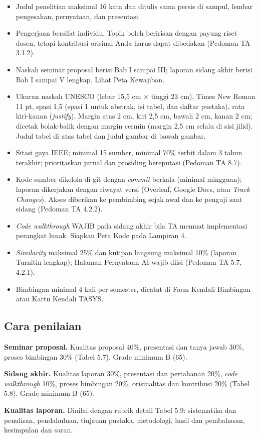 \begin{itemize}[label=\textbullet, leftmargin=1.2em, itemsep=2pt]
  \item Judul penelitian maksimal 16 kata dan ditulis sama persis di sampul,
        lembar pengesahan, pernyataan, dan presentasi.
  \item Pengerjaan bersifat individu. Topik boleh beririsan dengan payung riset
        dosen, tetapi kontribusi orisinal Anda harus dapat dibedakan (Pedoman
        TA 3.1.2).
  \item Naskah seminar proposal berisi Bab I sampai III; laporan sidang akhir
        berisi Bab I sampai V lengkap. Lihat Peta Kewajiban.
  \item Ukuran naskah UNESCO (lebar 15,5 cm $\times$ tinggi 23 cm), Times New
        Roman 11 pt, spasi 1,5 (spasi 1 untuk abstrak, isi tabel, dan daftar
        pustaka), rata kiri-kanan (\textit{justify}). Margin atas 2 cm, kiri
        2,5 cm, bawah 2 cm, kanan 2 cm; dicetak bolak-balik dengan margin
        cermin (margin 2,5 cm selalu di sisi jilid). Judul tabel di atas tabel
        dan judul gambar di bawah gambar.
  \item Sitasi gaya IEEE; minimal 15 sumber, minimal 70\% terbit dalam 3 tahun
        terakhir; prioritaskan jurnal dan prosiding bereputasi (Pedoman TA 8.7).
  \item Kode sumber dikelola di git dengan \textit{commit} berkala (minimal
        mingguan); laporan dikerjakan dengan riwayat versi (Overleaf, Google
        Docs, atau \textit{Track Changes}). Akses diberikan ke pembimbing sejak
        awal dan ke penguji saat sidang (Pedoman TA 4.2.2).
  \item \textit{Code walkthrough} WAJIB pada sidang akhir bila TA memuat
        implementasi perangkat lunak. Siapkan Peta Kode pada Lampiran 4.
  \item \textit{Similarity} maksimal 25\% dan kutipan langsung maksimal 10\%
        (laporan Turnitin lengkap); Halaman Pernyataan AI wajib diisi (Pedoman
        TA 5.7, 4.2.1).
  \item Bimbingan minimal 4 kali per semester, dicatat di Form Kendali
        Bimbingan atau Kartu Kendali TASYS.
\end{itemize}

\subsection*{Cara penilaian}
\noindent\textbf{Seminar proposal.} Kualitas proposal 40\%, presentasi dan
tanya jawab 30\%, proses bimbingan 30\% (Tabel 5.7). Grade minimum B (65).

\noindent\textbf{Sidang akhir.} Kualitas laporan 30\%, presentasi dan
pertahanan 20\%, \textit{code walkthrough} 10\%, proses bimbingan 20\%,
orisinalitas dan kontribusi 20\% (Tabel 5.8). Grade minimum B (65).

\noindent\textbf{Kualitas laporan.} Dinilai dengan rubrik detail Tabel 5.9:
sistematika dan penulisan, pendahuluan, tinjauan pustaka, metodologi, hasil
dan pembahasan, kesimpulan dan saran.
\clearpage

